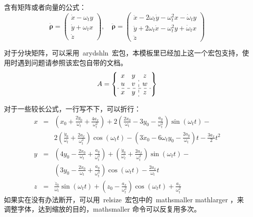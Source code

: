 含有矩阵或者向量的公式：
\begin{equation}\label{eq:rho}
\dot{\boldsymbol{\rho}}=\left( \begin{array}{c}
\dot{x}-\omega_{t}y\\\dot{y}+\omega_{t}x\\\dot{z}
\end{array}\right) , \quad
\ddot{\boldsymbol{\rho}}=\left( \begin{array}{c}
\ddot{x}-2\omega_{t}\dot{y}-\omega_{t}^{2}x-\dot{\omega}_{t}y\\
\ddot{y}+2\omega_{t}\dot{x}-\omega_{t}^{2}y+\dot{\omega}_{t}x\\
\ddot{z}
\end{array}\right)
\end{equation}

对于分块矩阵，可以采用~arydshln~宏包，本模板里已经加上这一个宏包支持，使用时遇到问题请参照该宏包自带的文档。
\begin{equation}
A = \left\{ \begin{array}{cc:c} %
 x & y & z \\
 u & v & w \\ \hdashline   %
 x & y & z
 \end{array} \right\}
 \end{equation}


对于一些较长公式，一行写不下，可以折行：
{\setlength\arraycolsep{2pt}
\begin{eqnarray}
x & = & \left( x_{0}+\frac{2\dot{y}_{0}}{\omega_{t}}+\frac{4a_{x}}{\omega_{t}^{2}}\right) +2\left( \frac{2\dot{x}_{0}}{\omega_{t}}-3y_{0}-\frac{a_{y}}{\omega_{t}^{2}}\right) \sin (\omega_{t} t)- \nonumber\\
& & 2\left( \frac{\dot{y}_{0}}{\omega_{t}}+\frac{2a_{x}}{\omega_{t}^{2}}\right) \cos (\omega_{t} t)-\left( 3\dot{x}_{0}-6\omega_{t} y_{0}-\frac{2a_{y}}{\omega_{t}}\right) t-\frac{3a_{x}}{2}t^{2} \\
y & = & \left( 4y_{0}-\frac{2\dot{x}_{0}}{\omega_{t}}+\frac{a_{y}}{\omega_{t}^{2}} \right) +\left( \frac{\dot{y}_{0}}{\omega_{t}}+\frac{2a_{x}}{\omega_{t}^{2}}\right) \sin (\omega_{t} t) -\nonumber\\
& & \left( 3y_{0}-\frac{2\dot{x}_{0}}{\omega_{t}}+\frac{a_{y}}{\omega_{t}^{2}}\right) \cos (\omega_{t}t)-\frac{2a_{x}}{\omega_{t}}t \\
z & = & \frac{\dot{z}_{0}}{\omega_{t}}\sin (\omega_{t}t)+\left( z_{0}-\frac{a_{x}}{\omega_{t}^{2}}\right)\cos (\omega_{t}t)+\frac{a_{z}}{\omega_{t}^{2}}
\end{eqnarray}}
如果实在没有办法断开，可以用~relsize~宏包中的~mathsmaller mathlarger ，来调整字体，达到缩放的目的，mathsmaller 命令可以反复用多次。

